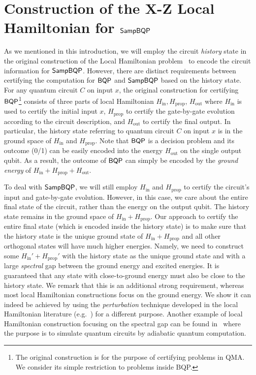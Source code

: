 \section{Construction of the X-Z Local Hamiltonian for $\operatorname{\mathsf{SampBQP}}$}
\label{sec:Hamiltonian}


\def \Hin {H_{\mathrm{in}}}
\def \Hout {H_{\mathrm{out}}}
\def \Hprop {H_{\mathrm{prop}}}
\newcommand{\histpsi}[1]{\ket{\psi_{#1}^{\mathrm{hist}}}}


As we mentioned in this introduction, we will employ the circuit \emph{history} state in the original construction of the Local Hamiltonian problem~\cite{kitaev2002classical} to encode the circuit information for $\operatorname{\mathsf{SampBQP}}$. 
However, there are distinct requirements between certifying the computation for $\operatorname{\mathsf{BQP}}$ and $\operatorname{\mathsf{SampBQP}}$ based on the history state.
For any quantum circuit $C$ on input $x$, the original construction for certifying $\operatorname{\mathsf{BQP}}$\footnote{The original construction is for the purpose of certifying problems in QMA. We consider its simple restriction to problems inside BQP.} consists of three parts of local Hamiltonian $\Hin, \Hprop$, $\Hout$ where $\Hin$ is used to certify the initial input $x$, $\Hprop$ to certify the gate-by-gate evolution according to the circuit description, and $\Hout$ to certify the final output. 
In particular, the history state referring to quantum circuit $C$ on input $x$ is in the ground space of $\Hin$ and $\Hprop$. Note that $\operatorname{\mathsf{BQP}}$ is a decision problem and its outcome (0/1) can be easily encoded into the energy $\Hout$ on the single output qubit. 
As a result, the outcome of $\operatorname{\mathsf{BQP}}$ can simply be encoded by the \emph{ground energy} of $\Hin + \Hprop + \Hout$. 

To deal with $\operatorname{\mathsf{SampBQP}}$, we will still employ $\Hin$ and $\Hprop$ to certify the circuit's input and gate-by-gate evolution. However, in this case, we care about the entire final state of the circuit, rather than the energy on the output qubit. The history state remains in the ground space of $\Hin + \Hprop$.  
Our approach to certify the entire final state (which is encoded inside the history state) is to make sure that the history state is the unique ground state of $\Hin + \Hprop$ and all other orthogonal states will have much higher energies. 
Namely, we need to construct some $\Hin'+ \Hprop'$ with the history state as the unique ground state and with a large \emph{spectral} gap between the ground energy and excited energies. 
It is guaranteed that any state with close-to-ground energy must also be close to the history state. 
We remark that this is an additional strong requirement, whereas most local Hamiltonian constructions focus on the ground energy. 
We show it can indeed be achieved by using the \emph{perturbation} technique 
developed in the local Hamiltonian literature (e.g.~\cite{kempe_kitaev_regev_2006}) for a different purpose. 
Another example of local Hamiltonian construction focusing on the spectral gap can be found in~\cite{adiabatic} where the purpose is to simulate quantum circuits by adiabatic quantum computation. 

